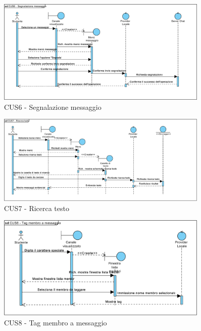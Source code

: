 \begin{figure}
	\centering
	\includegraphics[width=0.9\textwidth]{imgs/gruppo6/sequence/CUS6_segnalazione_messaggio.pdf}
	\caption{CUS6 - Segnalazione messaggio}
	\label{fig:seq-cus6}
\end{figure}

\begin{figure}
	\centering
	\includegraphics[width=0.9\textwidth]{imgs/gruppo6/sequence/CUS7_ricerca_testo.pdf}
	\caption{CUS7 - Ricerca testo}
	\label{fig:seq-cus7}
\end{figure}

\begin{figure}
	\centering
	\includegraphics[width=0.9\textwidth]{imgs/gruppo6/sequence/CUS8_tag_membro_a_messaggio.pdf}
	\caption{CUS8 - Tag membro a messaggio}
	\label{fig:seq-cus8}
\end{figure}

